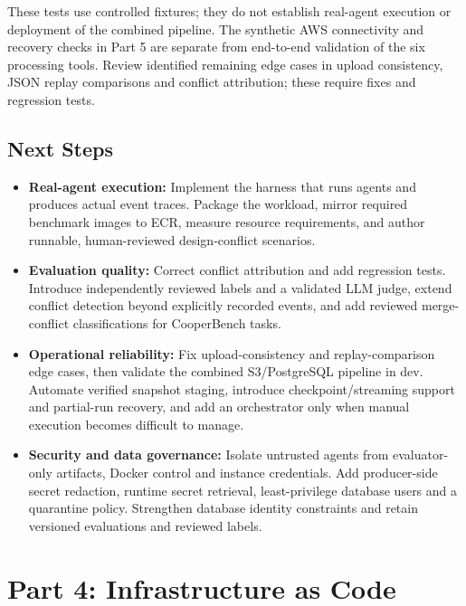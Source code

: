 \documentclass[11pt]{article}
\begin{document}
  These tests use controlled fixtures; they do not establish real-agent
  execution or deployment of the combined pipeline. The synthetic AWS
  connectivity and recovery checks in Part 5 are separate from end-to-end
  validation of the six processing tools. Review identified remaining
  edge cases in upload consistency, JSON replay comparisons and conflict
  attribution; these require fixes and regression tests.

\subsection*{Next Steps}

  \begin{itemize}
      \item \textbf{Real-agent execution:}
      Implement the harness that runs agents and produces actual event
      traces. Package the workload, mirror required benchmark images to
      ECR, measure resource requirements, and author runnable,
      human-reviewed design-conflict scenarios.

      \item \textbf{Evaluation quality:}
      Correct conflict attribution and add regression tests. Introduce
      independently reviewed labels and a validated LLM judge, extend
      conflict detection beyond explicitly recorded events, and add
      reviewed merge-conflict classifications for CooperBench tasks.

      \item \textbf{Operational reliability:}
      Fix upload-consistency and replay-comparison edge cases, then
      validate the combined S3/PostgreSQL pipeline in dev. Automate
      verified snapshot staging, introduce checkpoint/streaming support
      and partial-run recovery, and add an orchestrator only when manual
      execution becomes difficult to manage.

      \item \textbf{Security and data governance:}
      Isolate untrusted agents from evaluator-only artifacts, Docker
      control and instance credentials. Add producer-side secret
      redaction, runtime secret retrieval, least-privilege database
      users and a quarantine policy. Strengthen database identity
      constraints and retain versioned evaluations and reviewed labels.
  \end{itemize}
\clearpage

\section*{Part 4: Infrastructure as Code}
\end{document}
